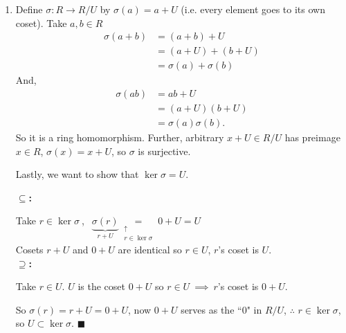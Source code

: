 \begin{lemma}
\begin{enumerate}[label=\roman*)]
    \noindent Furthermore, if $R$ has a multiplicative identity $1$ then so does $R/U$:
    \begin{align}
        \underbrace{(1+U)}_{\substack{``1" \\ \text{in }R/U}}(a+U)=(a+U) \nonumber
    \end{align}
    \item Define $\sigma : R \rightarrow R/U$ by $\sigma(a)=a+U$ (i.e. every element goes to its own
    coset). Take $a,b\in R$
    \begin{align}
        \sigma(a+b)&= (a+b)+U \nonumber \\
        &= (a+U)+(b+U) \nonumber \\
        &= \sigma(a)+\sigma(b) \nonumber
    \end{align}
    And,
    \begin{align}
        \sigma(ab)&= ab+U \nonumber \\
        &= (a+U)(b+U) \nonumber \\
        &= \sigma(a)\sigma(b) \nonumber.
    \end{align}
    So it is a ring homomorphism. Further, arbitrary $x+U \in R/U$ has preimage $x\in R$,
    $\sigma(x)=x+U$, so $\sigma$ is surjective.

    Lastly, we want to show that $\ker \sigma = U$. \steezybreak

    \noindent \textbf{$\subseteq$:} \steezybreak

    \noindent Take $r\in \ker\sigma \ $,
    $\ \ \underbrace{\sigma(r)}_{r+U}\underset{\substack{\uparrow \\ r\in \ker\sigma}}{=} 0+U=U$ \\
    Cosets $r+U$ and $0+U$ are identical so $r\in U$, $r$'s coset is $U$.\\
    \textbf{$\supseteq$:} \steezybreak

    \noindent Take $r\in U$. $U$ is the coset $0+U$ so $r\in U \ \implies \ r$'s coset is $0+U$.
    \steezybreak

    \noindent So $\sigma(r)=r+U=0+U$, now $0+U$ serves as the ``$0$" in $R/U$, $\therefore$
    $r\in \ker \sigma$, so $U\subset \ker \sigma$. $\blacksquare$
\end{enumerate}

\end{lemma}
